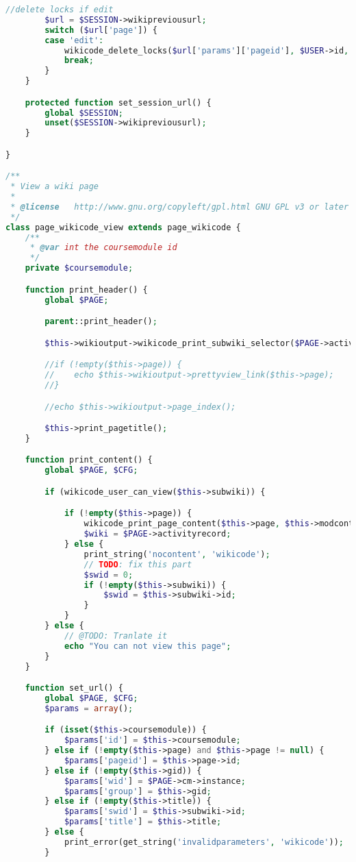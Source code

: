 \begin{lstlisting}[language=PHP]
        //delete locks if edit
        $url = $SESSION->wikipreviousurl;
        switch ($url['page']) {
        case 'edit':
            wikicode_delete_locks($url['params']['pageid'], $USER->id, $url['params']['section'], false);
            break;
        }
    }

    protected function set_session_url() {
        global $SESSION;
        unset($SESSION->wikipreviousurl);
    }

}

/**
 * View a wiki page
 *
 * @license   http://www.gnu.org/copyleft/gpl.html GNU GPL v3 or later
 */
class page_wikicode_view extends page_wikicode {
    /**
     * @var int the coursemodule id
     */
    private $coursemodule;

    function print_header() {
        global $PAGE;

        parent::print_header();

        $this->wikioutput->wikicode_print_subwiki_selector($PAGE->activityrecord, $this->subwiki, $this->page, 'view');

        //if (!empty($this->page)) {
        //    echo $this->wikioutput->prettyview_link($this->page);
        //}

        //echo $this->wikioutput->page_index();

        $this->print_pagetitle();
    }

    function print_content() {
        global $PAGE, $CFG;

        if (wikicode_user_can_view($this->subwiki)) {

            if (!empty($this->page)) {
                wikicode_print_page_content($this->page, $this->modcontext, $this->subwiki->id);
                $wiki = $PAGE->activityrecord;
            } else {
                print_string('nocontent', 'wikicode');
                // TODO: fix this part
                $swid = 0;
                if (!empty($this->subwiki)) {
                    $swid = $this->subwiki->id;
                }
            }
        } else {
            // @TODO: Tranlate it
            echo "You can not view this page";
        }
    }

    function set_url() {
        global $PAGE, $CFG;
        $params = array();

        if (isset($this->coursemodule)) {
            $params['id'] = $this->coursemodule;
        } else if (!empty($this->page) and $this->page != null) {
            $params['pageid'] = $this->page->id;
        } else if (!empty($this->gid)) {
            $params['wid'] = $PAGE->cm->instance;
            $params['group'] = $this->gid;
        } else if (!empty($this->title)) {
            $params['swid'] = $this->subwiki->id;
            $params['title'] = $this->title;
        } else {
            print_error(get_string('invalidparameters', 'wikicode'));
        }


\end{lstlisting}

